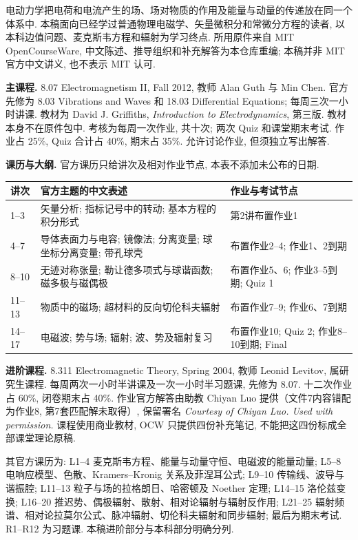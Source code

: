 \originalpreface
电动力学把电荷和电流产生的场、场对物质的作用及能量与动量的传递放在同一个体系中. 本稿面向已经学过普通物理电磁学、矢量微积分和常微分方程的读者, 以本科边值问题、麦克斯韦方程和辐射为学习终点. 所用原件来自 MIT OpenCourseWare, 中文陈述、推导组织和补充解答为本仓库重编; 本稿并非 MIT 官方中文讲义, 也不表示 MIT 认可.

\noindent\textbf{主课程.} 8.07 Electromagnetism II, Fall 2012, 教师 Alan Guth 与 Min Chen. 官方先修为 8.03 Vibrations and Waves 和 18.03 Differential Equations; 每周三次一小时讲课. 教材为 David J. Griffiths, \textit{Introduction to Electrodynamics}, 第三版. 教材本身不在原件包中. 考核为每周一次作业, 共十次; 两次 Quiz 和课堂期末考试. 作业占 25\%, Quiz 合计占 40\%, 期末占 35\%. 允许讨论作业, 但须独立写出解答.

\noindent\textbf{课历与大纲.} 官方课历只给讲次及相对作业节点, 本表不添加未公布的日期.
\begin{longtable}{p{}p{}p{}}
\toprule 讲次 & 官方主题的中文表述 & 作业与考试节点\\\midrule
1--3 & 矢量分析; 指标记号中的转动; 基本方程的积分形式 & 第2讲布置作业1\\
4--7 & 导体表面力与电容; 镜像法; 分离变量; 球坐标分离变量; 带孔球壳 & 布置作业2--4; 作业1、2到期\\
8--10 & 无迹对称张量; 勒让德多项式与球谐函数; 磁多极与磁偶极 & 布置作业5、6; 作业3--5到期; Quiz 1\\
11--13 & 物质中的磁场; 超材料的反向切伦科夫辐射 & 布置作业7--9; 作业6、7到期\\
14--17 & 电磁波; 势与场; 辐射; 波、势及辐射复习 & 布置作业10; Quiz 2; 作业8--10到期; Final\\\bottomrule
\end{longtable}

\clearpage
\noindent\textbf{进阶课程.} 8.311 Electromagnetic Theory, Spring 2004, 教师 Leonid Levitov, 属研究生课程. 每周两次一小时半讲课及一次一小时半习题课, 先修为 8.07. 十二次作业占 60\%, 闭卷期末占 40\%. 作业官方解答由助教 Chiyan Luo 提供（文件7内容错配为作业8, 第7套匹配解未取得）, 保留署名 \textit{Courtesy of Chiyan Luo. Used with permission.} 课程使用商业教材, OCW 只提供四份补充笔记, 不能把这四份标成全部课堂理论原稿.

其官方课历为: L1--4 麦克斯韦方程、能量与动量守恒、电磁波的能量动量; L5--8 电响应模型、色散、Kramers--Kronig 关系及菲涅耳公式; L9--10 传输线、波导与谐振腔; L11--13 粒子与场的拉格朗日、哈密顿及 Noether 定理; L14--15 洛伦兹变换; L16--20 推迟势、偶极辐射、散射、相对论辐射与辐射反作用; L21--25 辐射频谱、相对论拉莫尔公式、脉冲辐射、切伦科夫辐射和同步辐射; 最后为期末考试. R1--R12 为习题课. 本稿进阶部分与本科部分明确分列.

